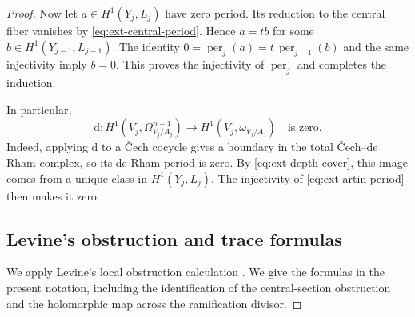 \documentclass[11pt,a4paper]{article}
\theoremstyle{definition}\newtheorem{definition}[theorem]{Definition}
\theoremstyle{remark}\newtheorem*{remark}{Remark}
\newcommand{\dd}{\mathrm d}
\newcommand{\per}{\operatorname{per}}\newcommand{\Tr}{\operatorname{Tr}}
\begin{document}
\begin{proof}
Now let $a\in H^1(Y_j,L_j)$ have zero period.
Its reduction to the central fiber vanishes by
\eqref{eq:ext-central-period}. Hence $a=tb$ for some
$b\in H^1(Y_{j-1},L_{j-1})$.
The identity $0=\per_j(a)=t\,\per_{j-1}(b)$ and the same injectivity
imply $b=0$. This proves the injectivity of $\per_j$ and completes the
induction.

In particular,
\begin{equation}\label{eq:ext-d-zero}
 \dd:H^1(V_j,\Omega^{n-1}_{V_j/A_j})
 \longrightarrow H^1(V_j,\omega_{V_j/A_j})
 \quad\text{is zero}.
\end{equation}
Indeed, applying $\dd$ to a \v{C}ech cocycle gives a boundary in the
total \v{C}ech--de Rham complex, so its de Rham period is zero.
By \eqref{eq:ext-depth-cover}, this image comes from a unique class in
$H^1(Y_j,L_j)$. The injectivity of \eqref{eq:ext-artin-period} then makes
it zero.

\subsection{Levine's obstruction and trace formulas}

We apply Levine's local obstruction calculation
\cite[Lemmas~1.2--1.5, pp.~295--298]{Levine1983}.
We give the formulas in the present notation, including the identification
of the central-section obstruction and the holomorphic map across the
ramification divisor.


\end{proof}
\end{document}
